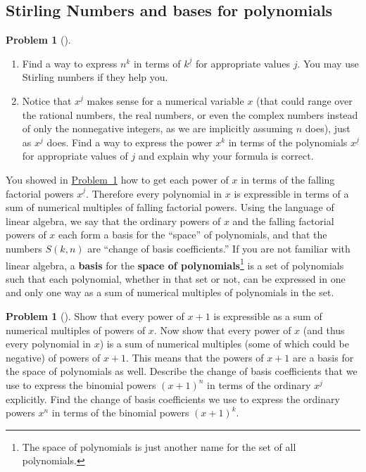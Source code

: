 \documentclass[10pt,]{book}
\newcommand{\terminology}[1]{\textbf{#1}}
\theoremstyle{plain}
\theoremstyle{definition}
\newtheorem{activity}[project]{Problem}
\theoremstyle{definition}
\numberwithin{equation}{chapter}
\begin{document}
\subsection[{Stirling Numbers and bases for polynomials}]{Stirling Numbers and bases for polynomials}\label{subsection-35}
\begin{activity}[] \label{powersfromfalling}
\leavevmode%
\begin{enumerate}[font=\bfseries,label=(\alph*),ref=\alph*]
\item\label{task-111} \marginsymbol[-2.5em]{} Find a way to express \(n^k\) in terms of \(k^{\underline{j}}\) for appropriate values \(j\). You may use Stirling numbers if they help you.%
\item\label{task-112} \marginsymbol[-2.5em]{} Notice that \(x^{\underline{j}}\) makes sense for a numerical variable \(x\) (that could range over the rational numbers, the real numbers, or even the complex numbers instead of only the nonnegative integers, as we are implicitly assuming \(n\) does), just as \(x^j\) does. Find a way to express the power \(x^k\) in terms of the polynomials \(x^{\underline{j}}\) for appropriate values of \(j\) and explain why your formula is correct.%
\end{enumerate}
\end{activity}
You showed in \hyperref[powersfromfalling]{Problem~\ref{powersfromfalling}} how to get each power of \(x\) in terms of the falling factorial powers \(x^{\underline{j}}\). Therefore every polynomial in \(x\) is expressible in terms of a sum of numerical multiples of falling factorial powers. Using the language of linear algebra, we say that the ordinary powers of \(x\) and the falling factorial powers of \(x\) each form a basis for the ``space'' of polynomials, and that the numbers \(S(k,n)\) are ``change of basis coefficients.'' If you are not familiar with linear algebra, a \terminology{basis} for the \terminology{space of polynomials}\footnote{The space of polynomials is just another name for the set of all polynomials.\label{fn-8}} is a set of polynomials such that each polynomial, whether in that set or not, can be expressed in one and only one way as a sum of numerical multiples of polynomials in the set.%
\begin{activity}[] \label{activity-153}
Show that every power of \(x+1\) is expressible as a sum of numerical multiples of powers of \(x\). Now show that every power of \(x\) (and thus every polynomial in \(x\)) is a sum of numerical multiples (some of which could be negative) of powers of \(x+1\). This means that the powers of \(x+1\) are a basis for the space of polynomials as well. Describe the change of basis coefficients that we use to express the binomial powers \((x+1)^n\) in terms of the ordinary \(x^j\) explicitly. Find the change of basis coefficients we use to express the ordinary powers \(x^n\) in terms of the binomial powers \((x+1)^k\).%
\end{activity}
\end{document}
